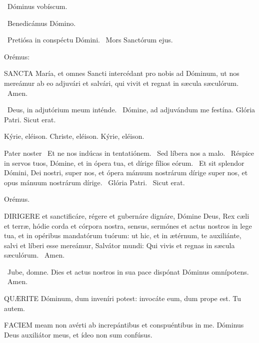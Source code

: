 \V\ Dóminus vobíscum.

\V\ Benedicámus Dómino.


\V\ Pretiósa in conspéctu Dómini. \R\ Mors Sanctórum ejus.

 Orémus:


\lettrine[lines=2]{S}{ANCTA} María, et omnes Sancti intercédant pro nobis ad Dóminum, ut nos mereámur ab eo adjuvári et salvári, qui vivit et regnat in sæcula sæculórum. \R\ Amen.

\V\ Deus, in adjutórium meum inténde. \R\ Dómine, ad adjuvándum me festína.  Glória Patri. Sicut erat.

Kýrie, eléison. Christe, eléison. Kýrie, eléison.

Pater noster  \V\ Et ne nos indúcas in tentatiónem. \R\ Sed líbera nos a malo. \V\ Réspice in servos tuos, Dómine, et in ópera tua, et dírige fílios eórum. \R\ Et sit splendor Dómini, Dei nostri, super nos, et ópera mánuum nostrárum dírige super nos, et opus mánuum nostrárum dírige. \V\ Glória Patri. \R\ Sicut erat.

Orémus. 

\lettrine[lines=2]{D}{IRIGERE} et sanctificáre, régere et gubernáre dignáre, Dómine Deus, Rex cæli et terræ, hódie corda et córpora nostra, sensus, sermónes et actus nostros in lege tua, et in opéribus mandatórum tuórum: ut hic, et in ætérnum, te auxiliánte, salvi et líberi esse mereámur, Salvátor mundi: Qui vivis et regnas in sæcula sæculórum. \R\ Amen.

\V\ Jube, domne.  Dies et actus nostros in sua pace dispónat Dóminus omnípotens. \R\ Amen.



\lettrine[lines=2]{Q}{UÆRITE} Dóminum, dum inveníri potest: invocáte eum, dum prope est. Tu autem.


\lettrine[lines=2]{F}{ACIEM} meam non avérti ab increpántibus et conspuéntibus in me. Dóminus Deus auxiliátor meus, et ídeo non sum confúsus.


